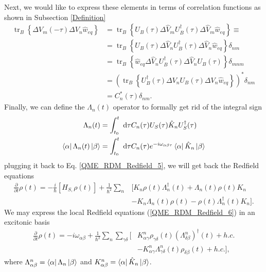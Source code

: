 Next, we would like to express these elements in terms of correlation functions as shown in Subsection \ref{Definition}
\begin{equation}
    \begin{aligned}
    \operatorname{tr}_{B}\left\{\Delta V_{m}(-\tau) \Delta V_{n} \hat{w}_{eq} \right\} &=\operatorname{tr}_{B}\left\{U_{B}(\tau) \Delta \hat{V}_{m} U_{B}^\dagger(\tau) \Delta \hat{V}_{m} \hat{w}_{eq}\right\} \equiv \\
    & = \operatorname{tr}_{B}\left\{U_{B}(\tau) \Delta \hat{V}_{n} U_{B}^\dagger(\tau) \Delta \hat{V}_{n} \hat{w}_{eq}\right\} \delta_{n m} \\
    &=\operatorname{tr}_{B}\left\{\hat{w}_{eq} \Delta \hat{V}_{n} U_{B}^\dagger(\tau) \Delta \hat{V}_{n} U_{B}(\tau)\right\} \delta_{mn m} \\
    &=\left(\operatorname{tr}_{B}\left\{U_{B}^\dagger(\tau) \Delta V_{n} U_{B}(\tau) \Delta V_{n} \hat{w}_{eq}\right\}\right)^{*} \delta_{n m} \\
    &=C_{n}^{*}(\tau) \delta_{n m}.
    \end{aligned}
\end{equation}
Finally, we can define the $\Lambda_n(t)$ operator to formally get rid of the integral sign
\begin{equation}
    \begin{aligned}
    \Lambda_n(t) &= \int_{t_0}^{t} \mathrm{~d} \tau C_n(\tau) U_S(\tau) \hat{K}_n U_S^\dagger(\tau) \\
    \bra{\alpha} \Lambda_n(t) \ket{\beta}&= \int_{t_0}^{t} \mathrm{~d} \tau C_n(\tau) e^{-i\omega_{\alpha \beta \tau}} \bra{\alpha} \hat{K}_n \ket{\beta}
    \end{aligned}
\end{equation}
plugging it back to Eq. \ref{QME_RDM_Redfield_5}, we will get back the Redfield equations
\begin{equation}
\label{QME_RDM_Redfield_6}
    \begin{aligned}
    \frac{\partial}{\partial t} \rho(t)=-\frac{i}{\hbar}\left[H_{S,} \rho(t)\right]+\frac{1}{\hbar^{2}} \sum_{n} & \Big[K_{n} \rho(t) \Lambda_{n}^\dagger(t)+\Lambda_{n}(t) \rho(t) K_{n} \\
    &-K_{n} \Lambda_{n}(t) \rho(t)-\rho(t) \Lambda_{n}^\dagger(t) K_{n}\Big].
    \end{aligned}
\end{equation}
We may express the local Redfield equations (\ref{QME_RDM_Redfield_6}) in an excitonic basis
\begin{equation}
\label{QME_RDM_Redfield_7}
    \begin{aligned}
    \frac{\partial}{\partial t} \rho(t)=-i \omega_{\alpha \beta} + \frac{1}{\hbar^{2}} \sum_{n} \sum_{\gamma \delta} \Big[&K^{n}_{\alpha\gamma} \rho_{\gamma \delta}(t) (\Lambda^{n}_{\delta \beta})^\dagger(t)+ h.c. \\
    & - K^{n}_{\alpha\gamma} \Lambda^{n}_{\gamma \delta}(t) \rho_{\delta \beta}(t) + h.c. \Big],
    \end{aligned}
\end{equation}
where $\Lambda^{n}_{\alpha\beta} = \bra{\alpha} \Lambda_n \ket{\beta}$ and $K^{n}_{\alpha\beta} = \bra{\alpha} \hat{K}_n \ket{\beta}$.

